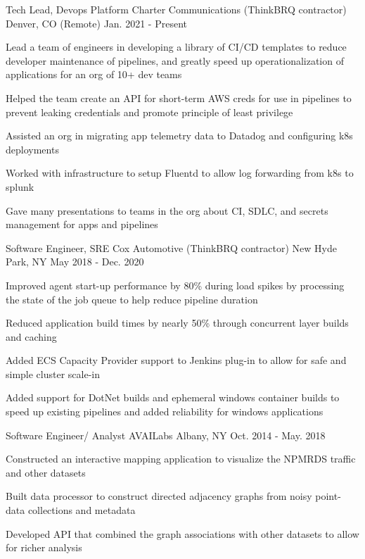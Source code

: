 \vspace{-3mm}

\begin{cventries}
  \vspace{1mm}
  \cventry
  {Tech Lead, Devops Platform}
  {Charter Communications (ThinkBRQ contractor)}
  {Denver, CO (Remote)}
  {Jan. 2021 - Present}
  {
    \begin{cvitems} %
		\item {Lead a team of engineers in developing a library of CI/CD templates
        to reduce developer maintenance of pipelines, and greatly speed up
        operationalization of applications for an org of 10+ dev teams}
		\item {Helped the team create an API for short-term AWS creds for use in
        pipelines to prevent leaking credentials and promote principle of least
        privilege}
    \item {Assisted an org in migrating app telemetry data to Datadog and
        configuring k8s deployments}
    \item {Worked with infrastructure to setup Fluentd to allow log forwarding
        from k8s to splunk}
    \item {Gave many presentations to teams in the org about CI, SDLC, and secrets
        management for apps and pipelines}
    \end{cvitems}
  }

  \cventry
  {Software Engineer, SRE}
  {Cox Automotive (ThinkBRQ contractor)}
  {New Hyde Park, NY}
  {May 2018 - Dec. 2020}
  {
    \begin{cvitems}
        \item{ Improved agent start-up performance by 80\% during load spikes by
            processing the state of the job queue to help reduce pipeline duration}
        \item { Reduced application build times by nearly 50\% through
            concurrent layer builds and caching }
        \item { Added ECS Capacity Provider support to Jenkins plug-in to allow
            for safe and simple cluster scale-in }
        \item { Added support for DotNet builds and ephemeral windows container
            builds to speed up existing pipelines and added reliability for
            windows applications}
     \end{cvitems}
  }


  \cventry
  {Software Engineer/ Analyst}
  {AVAILabs}
  {Albany, NY}
  {Oct. 2014 - May. 2018}
  {
    \begin{cvitems}
    \item {Constructed an interactive mapping application to visualize the NPMRDS traffic and other datasets}
    \item {Built data processor to construct directed adjacency graphs from
        noisy point-data collections and metadata  }
    \item {Developed API that combined the graph associations with other datasets to allow for richer analysis}
    \end{cvitems}
  }
  \vspace{-3.5mm}

\end{cventries}